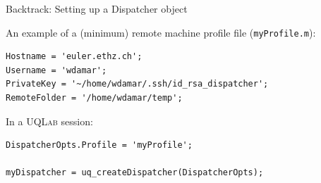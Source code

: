 \documentclass[]{rsuqbeamernew}
\begin{document}
\begin{frame}[fragile]{Backtrack: Setting up a Dispatcher object}

  

An example of a (minimum) remote machine profile file (\texttt{myProfile.m}):
\begin{lstlisting}[basicstyle=\scriptsize]
Hostname = 'euler.ethz.ch';
Username = 'wdamar';
PrivateKey = '~/home/wdamar/.ssh/id_rsa_dispatcher';
RemoteFolder = '/home/wdamar/temp';
\end{lstlisting}
  
In a \textsc{UQLab} session:
\begin{lstlisting}[basicstyle=\scriptsize,numbers=none]
DispatcherOpts.Profile = 'myProfile';
  
myDispatcher = uq_createDispatcher(DispatcherOpts);
\end{lstlisting}
  
\end{frame}
\end{document}
